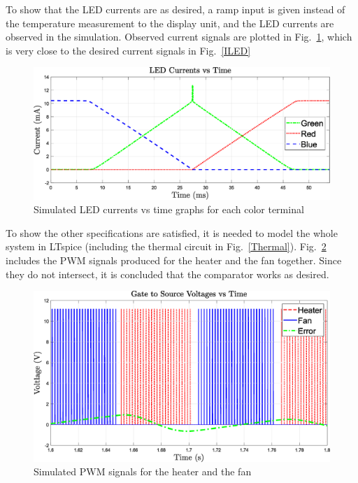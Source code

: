 \documentclass[conference]{IEEEtran}
\begin{document}
To show that the LED currents are as desired, a ramp input is given instead of the temperature measurement to the display unit, and the LED currents are observed in the simulation. Observed current signals are plotted in Fig.~\ref{displaySweep}, which is very close to the desired current signals in Fig.~\ref{ILED}

\begin{figure}
\centerline{\includegraphics[scale=0.31]{figures/displaySweep.eps}}
\caption{Simulated LED currents vs time graphs for each color terminal}
\label{displaySweep}
\end{figure}

To show the other specifications are satisfied, it is needed to model the whole system in LTspice (including the thermal circuit in Fig.~\ref{Thermal}). Fig.~\ref{pwmSim} includes the PWM signals produced for the heater and the fan together. Since they do not intersect, it is concluded that the comparator works as desired.

\begin{figure}
\centerline{\includegraphics[scale=0.31]{figures/pwmsim.eps}}
\caption{Simulated PWM signals for the heater and the fan}
\label{pwmSim}
\end{figure}
\end{document}
